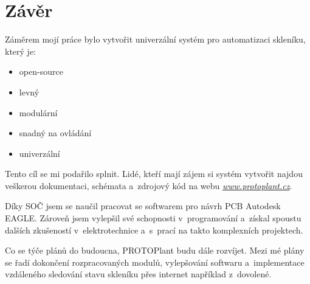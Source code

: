 \chapter*{Závěr}

Záměrem mojí práce bylo vytvořit univerzální systém pro automatizaci skle\-ní\-ku, který je:
\begin{itemize}
    \item open-source
    \item levný
    \item modulární
    \item snadný na ovládání
    \item univerzální
\end{itemize}

Tento cíl se mi podařilo splnit.
Lidé, kteří mají zájem si systém vytvořit najdou veškerou dokumentaci, schémata a~zdrojový kód na webu \textit{\url{www.protoplant.cz}}.

Díky SOČ jsem se naučil pracovat se softwarem pro návrh PCB Autodesk EAGLE.
Zároveň jsem vylepšil své schopnosti v~programování a~získal spoustu dalších zkušeností v~elektrotechnice a~s~prací na takto komplexních projektech.

Co se týče plánů do budoucna, PROTOPlant budu dále rozvíjet.
Mezi mé plány se řadí dokončení rozpracovaných modulů, vylepšování softwaru a~implementace vzdáleného sledování stavu skleníku přes internet například z~dovolené.

\fxnote[author=PŠ]{\textcolor{mygreen}{Přidat kecy o~prodeji PROTOPlantu a velké řeči}}

\newpage